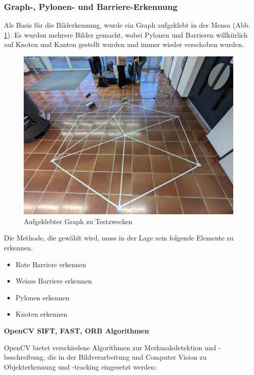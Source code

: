\subsubsection{Graph-, Pylonen- und Barriere-Erkennung}



Als Basis für die Bilderkennung, wurde ein Graph aufgeklebt in der Mensa (Abb. \ref{fig:test-graph}). Es wurden mehrere Bilder gemacht, wobei Pylonen und Barrieren willkürlich auf Knoten und Kanten gestellt wurden und immer wieder verschoben wurden.

\begin{figure}[H]
    \centering
    \includegraphics[width=1\linewidth]{assets/informatik-prototyp/opencv/test_graph.jpg}
    \caption{Aufgeklebter Graph zu Testzwecken}
    \label{fig:test-graph}
\end{figure}

Die Methode, die gewählt wird, muss in der Lage sein folgende Elemente zu erkennen.

\begin{itemize}
    \item Rote Barriere erkennen
    \item Weisse Barriere erkennen
    \item Pylonen erkennen
    \item Knoten erkennen
\end{itemize}

\textbf{OpenCV SIFT, FAST, ORB Algorithmen}

OpenCV bietet verschiedene Algorithmen zur Merkmalsdetektion und -beschreibung, die in der Bildverarbeitung und Computer Vision zu Objekterkennung und -tracking eingesetzt werden:

